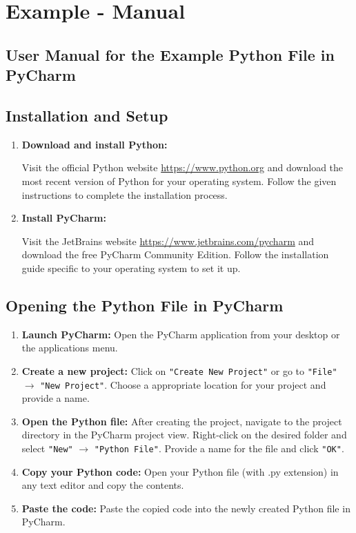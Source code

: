 \section{Example - Manual}

\subsection{User Manual for the Example Python File in PyCharm}

\subsection*{Installation and Setup}

\begin{enumerate}
	
	\item \textbf{Download and install Python:}
	
	Visit the official Python website \url{https://www.python.org} and download the most recent version of Python for your operating system. Follow the given instructions to complete the installation process.
	
	\item \textbf{Install PyCharm: }
	
	Visit the JetBrains website \url{https://www.jetbrains.com/pycharm} and download the free PyCharm Community Edition. Follow the installation guide specific to your operating system to set it up.
	
\end{enumerate}

\subsection*{Opening the Python File in PyCharm}

\begin{enumerate}
	
	\item \textbf{Launch PyCharm:} Open the PyCharm application from your desktop or the applications menu.
	
	\item \textbf{Create a new project:} Click on \texttt{"Create New Project"} or go to \texttt{"File"} $\rightarrow$ \texttt{"New Project"}. Choose a appropriate location for your project and provide a name.
		
	\item \textbf{Open the Python file:} After creating the project, navigate to the project directory in the PyCharm project view. Right-click on the desired folder and select \texttt{"New"} $\rightarrow$ \texttt{"Python File"}. Provide a name for the file and click \texttt{"OK"}.
	
	\item \textbf{Copy your Python code:} Open your Python file (with .py extension) in any text editor and copy the contents.
	
	\item \textbf{Paste the code:} Paste the copied code into the newly created Python file in PyCharm.
	
\end{enumerate}

